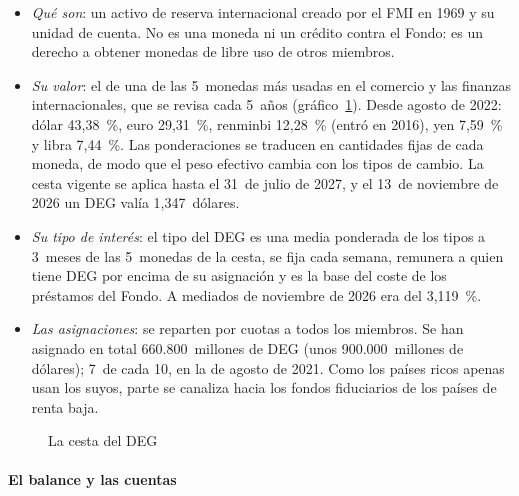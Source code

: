 \documentclass[11pt]{article}
\begin{document}
\begin{itemize}
\item \emph{Qué son}: un activo de reserva internacional creado por el FMI en 1969 y su unidad de cuenta. No es una moneda ni un crédito contra el Fondo: es un derecho a obtener monedas de libre uso de otros miembros.
\item \emph{Su valor}: el de una  de las 5~monedas más usadas en el comercio y las finanzas internacionales, que se revisa cada 5~años (gráfico~\ref{fig:cesta-deg}). Desde agosto de 2022: dólar 43,38~\%, euro 29,31~\%, renminbi 12,28~\% (entró en 2016), yen 7,59~\% y libra 7,44~\%. Las ponderaciones se traducen en cantidades fijas de cada moneda, de modo que el peso efectivo cambia con los tipos de cambio. La cesta vigente se aplica hasta el 31~de julio de 2027, y el 13~de noviembre de 2026 un DEG valía 1,347~dólares\nocite{FMI2022DEG,FMI2026ValorDEG}.
\item \emph{Su tipo de interés}: el tipo del DEG es una media ponderada de los tipos a 3~meses de las 5~monedas de la cesta, se fija cada semana, remunera a quien tiene DEG por encima de su asignación y es la base del coste de los préstamos del Fondo. A mediados de noviembre de 2026 era del 3,119~\%\nocite{FMI2026ValorDEG}.
\item \emph{Las asignaciones}: se reparten por cuotas a todos los miembros. Se han asignado en total 660.800~millones de DEG (unos 900.000~millones de dólares); 7~de cada 10, en la de agosto de 2021. Como los países ricos apenas usan los suyos, parte se canaliza hacia los fondos fiduciarios de los países de renta baja\nocite{FMI2023DEGFicha,FMI2026InformeAnual}.
\end{itemize}

\begin{figure}[H]
\centering
\caption{La cesta del DEG}\label{fig:cesta-deg}
\end{figure}

\paragraph{El balance y las cuentas}
\end{document}
